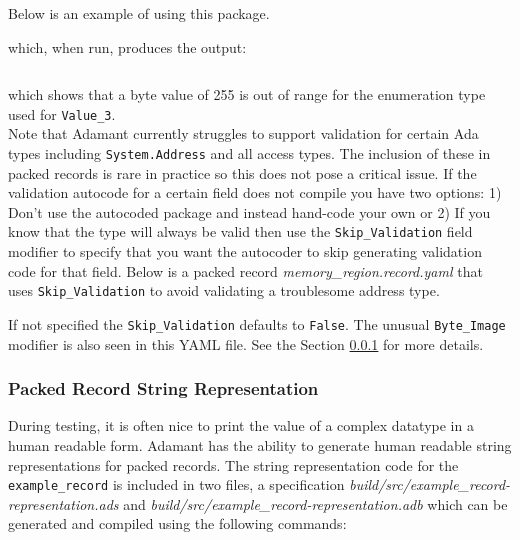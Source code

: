 Below is an example of using this package.


which, when run, produces the output:

\vspace{5mm} %
\inputminted{text}{../example_architecture/record_validation/output.txt}
\vspace{5mm} %

which shows that a byte value of 255 is out of range for the enumeration type used for \texttt{Value\_3}. \\

Note that Adamant currently struggles to support validation for certain Ada types including \texttt{System.Address} and all access types. The inclusion of these in packed records is rare in practice so this does not pose a critical issue. If the validation autocode for a certain field does not compile you have two options: 1) Don't use the autocoded package and instead hand-code your own or 2) If you know that the type will always be valid then use the \texttt{Skip\_Validation} field modifier to specify that you want the autocoder to skip generating validation code for that field. Below is a packed record \textit{memory\_region.record.yaml} that uses \texttt{Skip\_Validation} to avoid validating a troublesome address type.


If not specified the \texttt{Skip\_Validation} defaults to \texttt{False}. The unusual \texttt{Byte\_Image} modifier is also seen in this YAML file. See the Section \ref{Packed Record String Representation} for more details.

\subsubsection{Packed Record String Representation} \label{Packed Record String Representation}

During testing, it is often nice to print the value of a complex datatype in a human readable form. Adamant has the ability to generate human readable string representations for packed records. The string representation code for the \texttt{example\_record} is included in two files, a specification \textit{build/src/example\_record-representation.ads} and \textit{build/src/example\_record-representation.adb} which can be generated and compiled using the following commands: 

